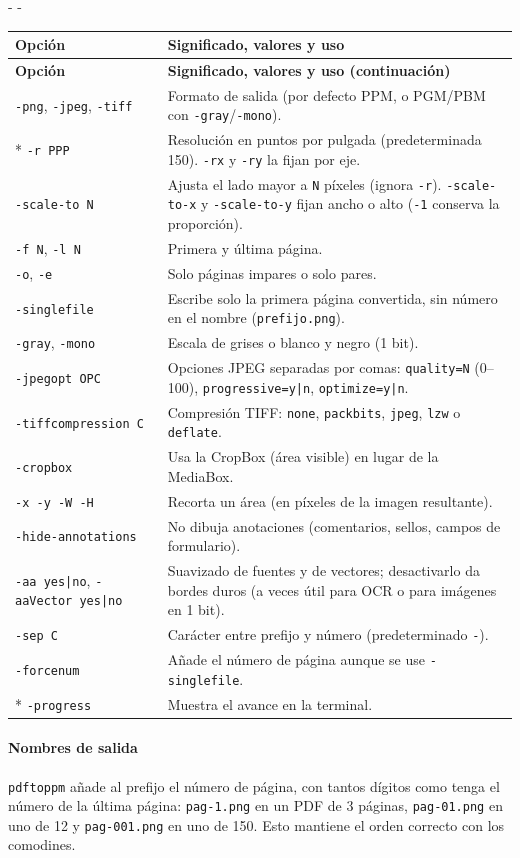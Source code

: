 \documentclass[11pt,a4paper]{article}
\makeatletter
\newcommand{\necesitaespacio}[1]{\par\penalty-100\begingroup
	\setlength{\dimen@}{#1}\dimen@ii\pagegoal\advance\dimen@ii-\pagetotal
	\ifdim\dimen@>\dimen@ii\ifdim\dimen@ii>\z@\vfil\fi\penalty-\@M\fi\endgroup}
\newenvironment{opciones}[1][Opción]{%
	\par\begingroup\small
	\begin{longtable}{L{4.25cm}L{11.2cm}}
		\toprule\rowcolor{tablacab}\cab{#1} & \cab{Significado, valores y uso} \\ \midrule
		\endfirsthead
		\toprule\rowcolor{tablacab}\cab{#1} & \cab{Significado, valores y uso (continuación)} \\ \midrule
		\endhead
		\bottomrule
		\endfoot}
	{\end{longtable}\endgroup}
\newcommand{\cmd}[1]{\texttt{\textcolor{colcmd}{#1}}}      %
\newcommand{\opt}[1]{\texttt{\textcolor{colopt}{#1}}}      %
\newcommand{\arch}[1]{\texttt{\textcolor{colarch}{#1}}}    %
\newcommand{\val}[1]{\texttt{#1}}                          %
\newcommand{\cab}[1]{\textbf{#1}}
\makeatother
\begin{document}
	\necesitaespacio{10\baselineskip}
	\begin{opciones}
		\opt{-png}, \opt{-jpeg}, \opt{-tiff} & Formato de salida (por defecto PPM, o PGM/PBM con \opt{-gray}/\opt{-mono}).\\*
		\opt{-r PPP} & Resolución en puntos por pulgada (predeterminada 150). \opt{-rx} y \opt{-ry} la fijan por eje.\\
		\opt{-scale-to N} & Ajusta el lado mayor a \val{N} píxeles (ignora \opt{-r}). \opt{-scale-to-x} y \opt{-scale-to-y} fijan ancho o alto (\val{-1} conserva la proporción).\\
		\opt{-f N}, \opt{-l N} & Primera y última página.\\
		\opt{-o}, \opt{-e} & Solo páginas impares o solo pares.\\
		\opt{-singlefile} & Escribe solo la primera página convertida, sin número en el nombre (\arch{prefijo.png}).\\
		\opt{-gray}, \opt{-mono} & Escala de grises o blanco y negro (1 bit).\\
		\opt{-jpegopt OPC} & Opciones JPEG separadas por comas: \val{quality=N} (0--100), \val{progressive=\allowbreak{}y|\allowbreak{}n}, \val{optimize=y|n}.\\
		\opt{-tiffcompression C} & Compresión TIFF: \val{none}, \val{packbits}, \val{jpeg}, \val{lzw} o \val{deflate}.\\
		\opt{-cropbox} & Usa la CropBox (área visible) en lugar de la MediaBox.\\
		\opt{-x -y -W -H} & Recorta un área (en píxeles de la imagen resultante).\\
		\opt{-hide-\allowbreak{}annotations} & No dibuja anotaciones (comentarios, sellos, campos de formulario).\\
		\opt{-aa yes|no}, \opt{-aaVector yes|\allowbreak{}no} & Suavizado de fuentes y de vectores; desactivarlo da bordes duros (a veces útil para OCR o para imágenes en 1 bit).\\
		\opt{-sep C} & Carácter entre prefijo y número (predeterminado \val{-}).\\
		\opt{-forcenum} & Añade el número de página aunque se use \opt{-singlefile}.\\*
		\opt{-progress} & Muestra el avance en la terminal.\\
	\end{opciones}
	
	\paragraph{Nombres de salida} \cmd{pdftoppm} añade al prefijo el número de página, con tantos dígitos como tenga el número de la última página: \arch{pag-1.png} en un PDF de 3 páginas, \arch{pag-01.png} en uno de 12 y \arch{pag-001.png} en uno de 150. Esto mantiene el orden correcto con los comodines.
	
\end{document}
